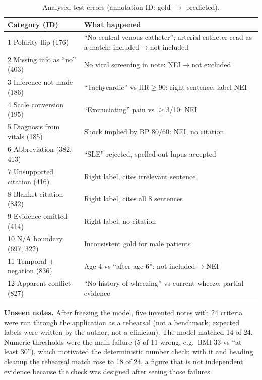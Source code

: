 \documentclass[conference]{IEEEtran}
\begin{document}
\begin{table}[t]
\centering
\caption{Analysed test errors (annotation ID: gold $\rightarrow$ predicted).}
\label{tab:errors}
\setlength{\tabcolsep}{2.5pt}
\footnotesize
\begin{tabular}{p{}p{}}
\toprule
Category (ID) & What happened \\
\midrule
1 Polarity flip (176) & ``No central venous catheter''; arterial catheter read as a match: included$\rightarrow$not included \\
2 Missing info as ``no'' (403) & No viral screening in note: NEI$\rightarrow$not excluded \\
3 Inference not made (186) & ``Tachycardic'' vs HR$\geq$90: right sentence, label NEI \\
4 Scale conversion (195) & ``Excruciating'' pain vs $\geq$3/10: NEI \\
5 Diagnosis from vitals (185) & Shock implied by BP 80/60: NEI, no citation \\
6 Abbreviation (382, 413) & ``SLE'' rejected, spelled-out lupus accepted \\
7 Unsupported citation (416) & Right label, cites irrelevant sentence \\
8 Blanket citation (832) & Right label, cites all 8 sentences \\
9 Evidence omitted (414) & Right label, no citation \\
10 N/A boundary (697, 322) & Inconsistent gold for male patients \\
11 Temporal + negation (836) & Age 4 vs ``after age 6'': not included$\rightarrow$NEI \\
12 Apparent conflict (827) & ``No history of wheezing'' vs current wheeze: partial evidence \\
\bottomrule
\end{tabular}
\end{table}

\textbf{Unseen notes.} After freezing the model, five invented notes with 24 criteria were run through the application as a rehearsal (not a benchmark; expected labels were written by the author, not a clinician). The model matched 14 of 24. Numeric thresholds were the main failure (5 of 11 wrong, e.g.\ BMI 33 vs ``at least 30''), which motivated the deterministic number check; with it and heading cleanup the rehearsal match rose to 18 of 24, a figure that is not independent evidence because the check was designed after seeing those failures.
\end{document}
